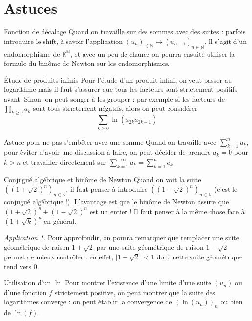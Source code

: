 \documentclass[french]{book}
\newcommand{\N}{\mathbb{N}}
\newcommand{\K}{\mathbb{K}}
\theoremstyle{plain}
\theoremstyle{definition}
\theoremstyle{remark}
\newtheorem*{app}{Application}
\begin{document}
\section{Astuces}
\begin{AS}{Fonction de décalage} Quand on travaille sur des sommes avec des suites : parfois introduire le shift, à savoir l’application $(u_n)_{\in\N}\mapsto(u_{n+1})_{n\in\N}$. Il s’agit d’un endomorphisme de $\K^\N$, et avec un peu de chance on pourra ensuite utiliser la formule du binôme de
Newton sur les endomorphismes.
\end{AS}
\begin{AS}{Étude de produits infinis} Pour l’étude d’un produit infini, on veut passer au logarithme mais il faut s’assurer que tous les facteurs sont strictement positifs avant. Sinon, on peut songer à les grouper : par exemple si les facteurs de $\displaystyle\prod_{k\geqslant0}a_k$ sont tous strictement négatifs, alors on
peut considérer $$\sum_{k\geqslant 0}\ln(a_{2k}a_{2k+1})$$
\end{AS}
\begin{AS}{Astuce pour ne pas s'embêter avec une somme} Quand on travaille avec $\displaystyle\sum_{k=1}^{n}a_k$, pour éviter d’avoir une discussion à faire, on peut
décider de prendre $a_k=0$ pour $k>n$ et travailler directement sur $\displaystyle\sum_{k=1}^{+\infty}a_k=\sum_{k=1}^{n}a_k$
\end{AS}
\begin{AS}{Conjugué algébrique et binôme de Newton} Quand on voit la suite $((1+\sqrt{2})^n)_{n\in\N}$, il faut penser à introduire $((1-\sqrt{2})^n)_{n\in\N}$ (c'est le conjugué algébrique !). L’avantage est que le binôme de Newton assure que $(1+\sqrt{2})^n +(1-\sqrt{2})^n$ est un entier ! Il faut penser à la même chose face à $(1+\sqrt{k})^n$ en général.
\end{AS}
\begin{app}
	Pour approfondir, on pourra remarquer que remplacer une suite géométrique de raison $1+\sqrt{2}$ par une suite géométrique de raison $1-\sqrt{2}$ permet de mieux contrôler : en effet, $\lvert 1-\sqrt{2}\rvert <1$ donc cette suite géométrique tend vers $0$.
\end{app}
\begin{AS}{Utilisation d'un $\ln$} Pour montrer l'existence d’une limite d’une suite $(u_n)$ ou d’une fonction $f$ strictement positive, on peut montrer que la suite des logarithmes converge : on peut établir la convergence de $(\ln(u_n))_n$ ou bien de $\ln(f)$.
\end{AS}
\end{document}
